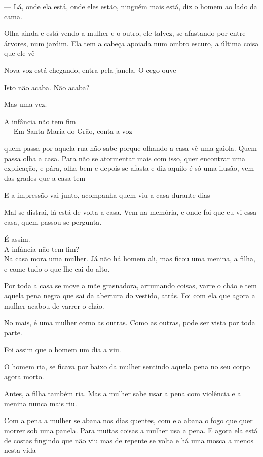 --- Lá, onde ela está, onde eles estão, ninguém mais está, diz o homem ao
lado da cama.

Olha ainda e está vendo a mulher e o outro, ele talvez, se afastando por
entre árvores, num jardim. Ela tem a cabeça apoiada num ombro escuro, a
última coisa que ele vê

\pagebreak

\vspace*{4cm}

Nova voz está chegando, entra pela janela. O cego ouve

Isto não acaba. Não acaba?

Mas uma vez.

A infância não tem fim\\

--- Em Santa Maria do Grão, conta a voz

quem passa por aquela rua não sabe porque olhando a casa vê uma gaiola.
Quem passa olha a casa. Para não se atormentar mais com isso, quer
encontrar uma explicação, e pára, olha bem e depois se afasta e diz
aquilo é só uma ilusão, vem das grades que a casa tem

E a impressão vai junto, acompanha quem viu a casa durante dias

Mal se distrai, lá está de volta a casa. Vem na memória, e onde foi que
eu vi essa casa, quem passou se pergunta.

É assim.\\

A infância não tem fim?\\

Na casa mora uma mulher. Já não há homem ali, mas ficou uma menina, a
filha, e come tudo o que lhe cai do alto.

Por toda a casa se move a mãe grasnadora, arrumando coisas, varre o chão
e tem aquela pena negra que sai da abertura do vestido, atrás. Foi com
ela que agora a mulher acabou de varrer o chão.

No mais, é uma mulher como as outras. Como as outras, pode ser vista por
toda parte.

Foi assim que o homem um dia a viu.

O homem ria, se ficava por baixo da mulher sentindo aquela pena no seu
corpo agora morto.

Antes, a filha também ria. Mas a mulher sabe usar a pena com violência e
a menina nunca mais riu.

Com a pena a mulher se abana nos dias quentes, com ela abana o fogo que
quer morrer sob uma panela. Para muitas coisas a mulher usa a pena. E
agora ela está de costas fingindo que não viu mas de repente se volta e
há uma mosca a menos nesta vida

